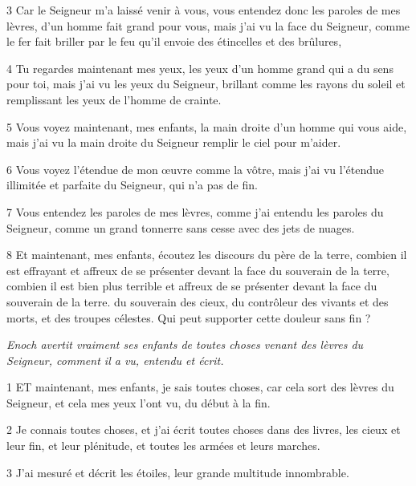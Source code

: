 \par 3 Car le Seigneur m'a laissé venir à vous, vous entendez donc les paroles de mes lèvres, d'un homme fait grand pour vous, mais j'ai vu la face du Seigneur, comme le fer fait briller par le feu qu'il envoie des étincelles et des brûlures,

\par 4 Tu regardes maintenant mes yeux, les yeux d'un homme grand qui a du sens pour toi, mais j'ai vu les yeux du Seigneur, brillant comme les rayons du soleil et remplissant les yeux de l'homme de crainte.

\par 5 Vous voyez maintenant, mes enfants, la main droite d'un homme qui vous aide, mais j'ai vu la main droite du Seigneur remplir le ciel pour m'aider.

\par 6 Vous voyez l'étendue de mon œuvre comme la vôtre, mais j'ai vu l'étendue illimitée et parfaite du Seigneur, qui n'a pas de fin.

\par 7 Vous entendez les paroles de mes lèvres, comme j'ai entendu les paroles du Seigneur, comme un grand tonnerre sans cesse avec des jets de nuages.

\par 8 Et maintenant, mes enfants, écoutez les discours du père de la terre, combien il est effrayant et affreux de se présenter devant la face du souverain de la terre, combien il est bien plus terrible et affreux de se présenter devant la face du souverain de la terre. du souverain des cieux, du contrôleur des vivants et des morts, et des troupes célestes. Qui peut supporter cette douleur sans fin ?


\par \textit{Enoch avertit vraiment ses enfants de toutes choses venant des lèvres du Seigneur, comment il a vu, entendu et écrit.}

\par 1 ET maintenant, mes enfants, je sais toutes choses, car cela sort des lèvres du Seigneur, et cela mes yeux l'ont vu, du début à la fin.

\par 2 Je connais toutes choses, et j'ai écrit toutes choses dans des livres, les cieux et leur fin, et leur plénitude, et toutes les armées et leurs marches.

\par 3 J'ai mesuré et décrit les étoiles, leur grande multitude innombrable.


